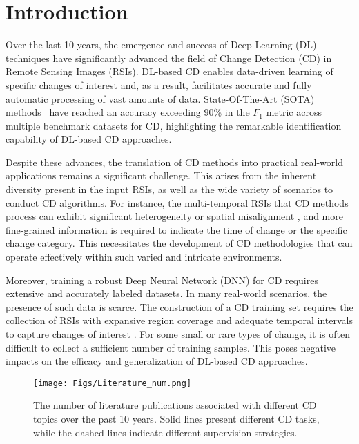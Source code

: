
\section{Introduction}\label{sec_intro}

Over the last 10 years, the emergence and success of Deep Learning (DL) techniques \cite{hong2024spectralgpt} have significantly advanced the field of Change Detection (CD) in Remote Sensing Images (RSIs). DL-based CD enables data-driven learning of specific changes of interest and, as a result, facilitates accurate and fully automatic processing of vast amounts of data. State-Of-The-Art (SOTA) methods~\cite{chen2021remote, Liky2023Changer, ding2024samcd} have reached an accuracy exceeding 90\% in the $F_1$ metric across multiple benchmark datasets for CD, highlighting the remarkable identification capability of DL-based CD approaches.

Despite these advances, the translation of CD methods into practical real-world applications remains a significant challenge. This arises from the inherent diversity present in the input RSIs, as well as the wide variety of scenarios to conduct CD algorithms. For instance, the multi-temporal RSIs that CD methods process can exhibit significant heterogeneity or spatial misalignment \cite{shi2020change}, and more fine-grained information is required to indicate the time of change or the specific change category. This necessitates the development of CD methodologies that can operate effectively within such varied and intricate environments.

Moreover, training a robust Deep Neural Network (DNN) for CD requires extensive and accurately labeled datasets. In many real-world scenarios, the presence of such data is scarce. The construction of a CD training set requires the collection of RSIs with expansive region coverage and adequate temporal intervals to capture changes of interest \cite{shen2021s2looking}. For some small or rare types of change, it is often difficult to collect a sufficient number of training samples. This poses negative impacts on the efficacy and generalization of DL-based CD approaches.

\begin{figure}[!t]
	\begin{center}
    \texttt{[image: Figs/Literature\_num.png]}
	\end{center}
	\caption{The number of literature publications associated with different CD topics over the past 10 years. Solid lines present different CD tasks, while the dashed lines indicate different supervision strategies.}
	\label{fig.paper_num}
\end{figure}

